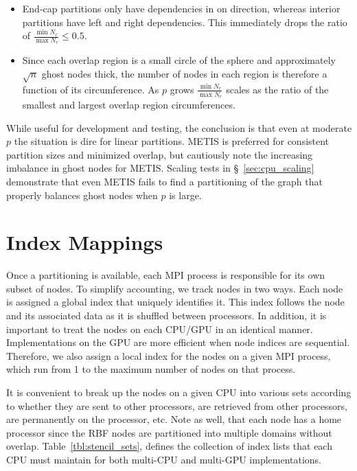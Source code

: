 \documentclass{report}
\begin{document}
\begin{itemize} 
\item End-cap partitions only have dependencies in on direction, whereas interior partitions have left and right dependencies. This immediately drops the ratio of $\frac{\min N_r}{\max N_r} \leq 0.5$. 
\item Since each overlap region is a small circle of the sphere and approximately $\sqrt{n}$ ghost nodes thick, the number of nodes in each region is therefore a function of its circumference. As $p$ grows $\frac{\min N_r}{\max N_r}$ scales as the ratio of the smallest and largest overlap region circumferences. 
\end{itemize}
While useful for development and testing, the conclusion is that even at moderate $p$ the situation is dire for linear partitions. METIS is preferred for consistent partition sizes and minimized overlap, but cautiously note the increasing imbalance in ghost nodes for METIS. Scaling tests in \S~\ref{sec:cpu_scaling} demonstrate that even METIS fails to find a partitioning of the graph that properly balances ghost nodes when $p$ is large.  

% 


\section{Index Mappings}

Once a partitioning is available, each MPI process is responsible for its own subset of nodes. 
To simplify accounting, we track nodes in two ways. Each node is assigned
a global index that uniquely identifies it. This index follows the node 
and its associated data as it is shuffled between processors. In addition, 
it is important to treat the nodes on each CPU/GPU in an identical manner. 
Implementations on the GPU are more efficient when node indices
are sequential. Therefore, we also assign a local index for the nodes on 
a given MPI process, which run from 1 to the maximum number of nodes on that process. 


It is convenient to break up the nodes on a given CPU into various sets
according to whether they are sent to other processors, are retrieved from 
other processors, are permanently on the processor, etc. Note as well, 
that each node has a home processor since the RBF nodes are partitioned into 
multiple domains without overlap.
Table~\ref{tbl:stencil_sets}, defines the collection of index lists that each CPU must maintain for both multi-CPU and multi-GPU implementations.  
\end{document}
